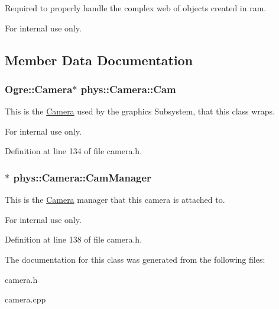 Required to properly handle the complex web of objects created in ram. 

\begin{DoxyInternal}{For internal use only.}
\end{DoxyInternal}


\subsection{Member Data Documentation}
\hypertarget{classphys_1_1Camera_a91622148b9b9a9ae1554c828f7e2fc89}{
\subsubsection[{Cam}]{\setlength{\rightskip}{0pt plus 5cm}Ogre::Camera$\ast$ {\bf phys::Camera::Cam}}}
\label{d9/df8/classphys_1_1Camera_a91622148b9b9a9ae1554c828f7e2fc89}


This is the \hyperlink{classphys_1_1Camera}{Camera} used by the graphics Subsystem, that this class wraps. 

\begin{DoxyInternal}{For internal use only.}
\end{DoxyInternal}


Definition at line 134 of file camera.h.

\hypertarget{classphys_1_1Camera_a909203ede748deb1b587a8758ba8cec4}{
\subsubsection[{CamManager}]{$\ast$ {\bf phys::Camera::CamManager}}}
\label{d9/df8/classphys_1_1Camera_a909203ede748deb1b587a8758ba8cec4}


This is the \hyperlink{classphys_1_1Camera}{Camera} manager that this camera is attached to. 

\begin{DoxyInternal}{For internal use only.}
\end{DoxyInternal}


Definition at line 138 of file camera.h.



The documentation for this class was generated from the following files:\begin{DoxyCompactItemize}
\item 
camera.h\item 
camera.cpp\end{DoxyCompactItemize}
